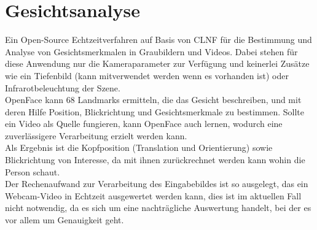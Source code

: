 \section{Gesichtsanalyse}
\label{OpenFace}
Ein Open-Source Echtzeitverfahren auf Basis von CLNF für die Bestimmung und Analyse von Gesichtsmerkmalen in Graubildern und Videos. Dabei stehen für diese Anwendung nur die Kameraparameter zur Verfügung und keinerlei Zusätze wie ein Tiefenbild (kann mitverwendet werden wenn es vorhanden ist) oder Infrarotbeleuchtung der Szene.\\
OpenFace kann 68 Landmarks ermitteln, die das Gesicht beschreiben, und mit deren Hilfe Position, Blickrichtung und Gesichtsmerkmale zu bestimmen. Sollte ein Video als Quelle fungieren, kann OpenFace auch lernen, wodurch eine zuverlässigere Verarbeitung erzielt werden kann.\\
Als Ergebnis ist die Kopfposition (Translation und Orientierung) sowie Blickrichtung von Interesse, da mit ihnen zurückrechnet werden kann wohin die Person schaut.\\
Der Rechenaufwand zur Verarbeitung des Eingabebildes ist so ausgelegt, das ein Webcam-Video in Echtzeit ausgewertet werden kann, dies ist im aktuellen Fall nicht notwendig, da es sich um eine nachträgliche Auswertung handelt, bei der es vor allem um Genauigkeit geht.
